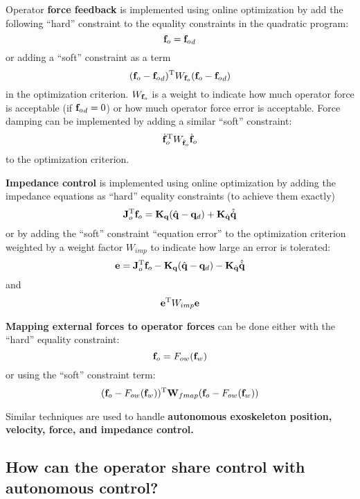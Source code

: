 \documentclass[letterpaper,12pt,fullpage]{article}
\begin{document}
Operator {\bf force feedback} is implemented using online optimization by
add the following ``hard'' constraint
to the equality constraints in the quadratic program:
\begin{equation}
{\bf f}_o = {{\bf f}_o}_d 
\end{equation}
or adding a ``soft'' constraint as a term
\begin{equation}
({\bf f}_o - {{\bf f}_o}_d)^{{\rm T}} W_{{\bf f}_o} ({\bf f}_o - {{\bf f}_o}_d)
\end{equation}
in the optimization criterion. $W_{{\bf f}_o}$ is a weight to indicate how much operator
force is acceptable (if ${{\bf f}_o}_d = 0$) or how much operator force error is
acceptable.
Force damping can be implemented by adding a similar ``soft'' constraint:
\begin{equation}
\dot{{\bf f}}_o^{{\rm T}} W_{\dot{{\bf f}}_o} \dot{{\bf f}}_o
\end{equation}
to the optimization criterion.

{\bf Impedance control} is implemented using online optimization by adding
the impedance equations as ``hard'' equality constraints (to achieve them exactly)
\begin{equation}
{\bf J}_o^{{\rm T}} {{\bf f}_o} = {\bf K}_{{\bf q}}( \hat{{\bf q}} - {\bf q}_d ) + {\bf K}_{\dot{{\bf q}}} \hat{\dot{{\bf q}}}
\end{equation}
or by adding the ``soft'' constraint ``equation error'' to the optimization criterion
weighted by a weight factor $W_{imp}$ to indicate
how large an error is tolerated:
\begin{equation}
{\bf e} = {\bf J}_o^{{\rm T}} {{\bf f}_o} - {\bf K}_{{\bf q}}( \hat{{\bf q}} - {\bf q}_d ) - {\bf K}_{\dot{{\bf q}}} \hat{\dot{{\bf q}}}
\end{equation}
and
\begin{equation}
{\bf e}^{{\rm T}} W_{imp} {\bf e}
\end{equation}

{\bf Mapping external forces to operator forces} can be done either with the
``hard'' equality constraint:
\begin{equation}
{\bf f}_o = F_{ow} ( {\bf f}_w )
\end{equation}
or using the ``soft'' constraint term:
\begin{equation}
({\bf f}_o - F_{ow} ( {\bf f}_w ))^{\rm T} {\bf W}_{fmap}  ({\bf f}_o - F_{ow} ( {\bf f}_w ))
\end{equation}

Similar techniques are used to handle {\bf autonomous exoskeleton position, velocity,
force, and impedance control.}

\subsection{How can the operator share control with autonomous control?}
\end{document}
